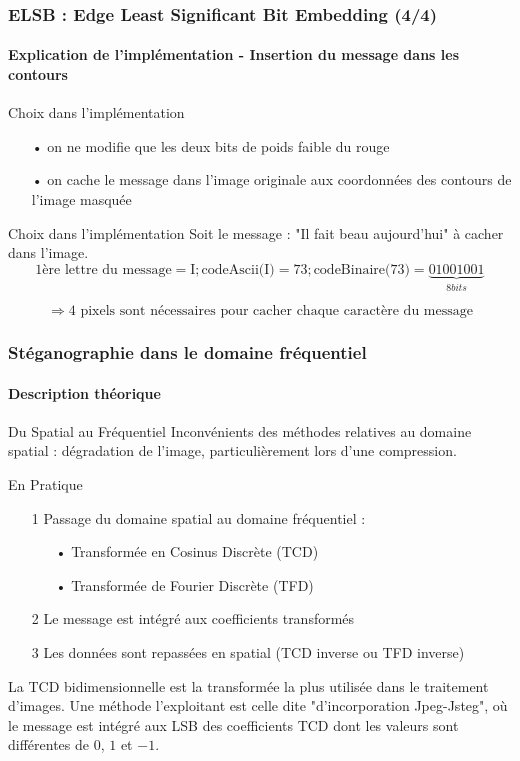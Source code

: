 \documentclass{beamer}
\begin{document}
\begin{frame}
\frametitle{ELSB : Edge Least Significant Bit Embedding (4/4)}
\framesubtitle{Explication de l'implémentation \-- \textbf{Insertion du message dans les contours}}

\begin{alertblock}{Choix dans l'implémentation}
\begin{itemize}
    \item[•] on ne modifie que les deux bits de poids faible du rouge
    \item[•] on cache le message dans l'image originale aux coordonnées des contours de l'image masquée 
\end{itemize}
\end{alertblock}

\begin{exampleblock}{Choix dans l'implémentation}
Soit le message : "Il fait beau aujourd'hui" à cacher dans l'image.
\[ \text{1ère lettre du message} = \text{I} ; \text{codeAscii(I)} = 73 ; \text{codeBinaire(} 73 \text{)} = \underbrace{01001001}_{8 bits} \]

\[ \Rightarrow 4 \text{ pixels sont nécessaires pour cacher chaque caractère du message} \]
\end{exampleblock}

\end{frame}

\begin{frame}
\frametitle{Stéganographie dans le domaine fréquentiel}
\framesubtitle{Description théorique}

\begin{block}{Du Spatial au Fréquentiel}
Inconvénients des méthodes relatives au domaine spatial : dégradation de l'image, particulièrement lors d'une compression. \\
\end{block}

\begin{block}{En Pratique}
\begin{itemize}
\item[1] Passage du domaine spatial au domaine fréquentiel : \\
\begin{itemize}
    \item[•] Transformée en Cosinus Discrète (TCD)
    \item[•] Transformée de Fourier Discrète (TFD)
\end{itemize}
\item[2] Le message est intégré aux coefficients transformés
\item[3] Les données sont repassées en spatial (TCD inverse ou TFD inverse)
\end{itemize}

La TCD bidimensionnelle est la transformée la plus utilisée dans le traitement d'images. Une méthode l'exploitant est celle dite "d’incorporation Jpeg-Jsteg", où le message est intégré aux LSB des coefficients TCD dont les valeurs sont différentes de $ 0 $, $ 1 $ et $ -1 $.
\end{block}
\end{frame}
\end{document}
